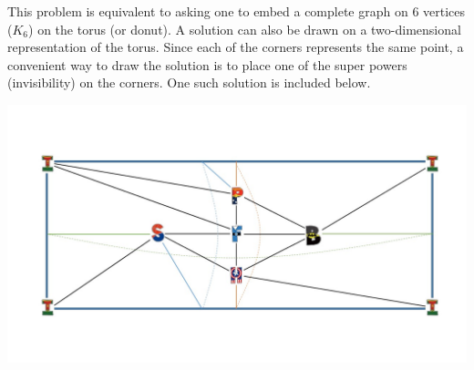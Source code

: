 


This problem is equivalent to asking one to embed a complete graph on 6 vertices ($K_6$) on the torus (or donut). A solution can also be drawn on a two-dimensional representation of the torus. Since each of the corners represents the same point, a convenient way to draw the solution is to place one of the super powers (invisibility) on the corners. One such solution is included below.

    \includegraphics[width=\textwidth]{assets/kat/sol2}
